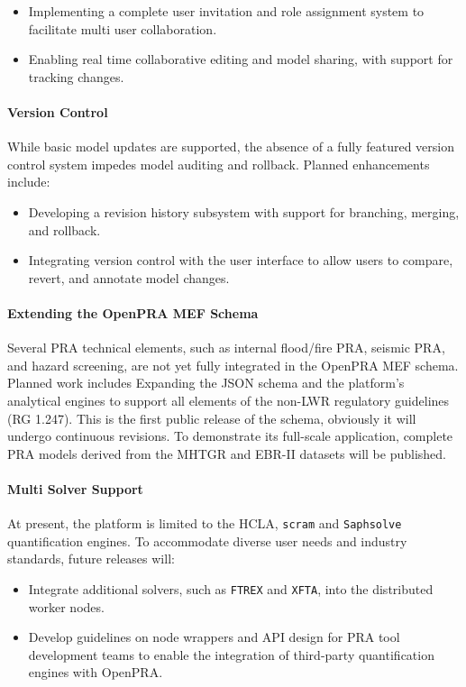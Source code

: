 \begin{itemize}
    \item Implementing a complete user invitation and role assignment system to facilitate multi user collaboration.
    \item Enabling real time collaborative editing and model sharing, with support for tracking changes.
\end{itemize}

\paragraph{Version Control}

While basic model updates are supported, the absence of a fully featured version control system impedes model auditing and rollback. Planned enhancements include:
\begin{itemize}
    \item Developing a revision history subsystem with support for branching, merging, and rollback.
    \item Integrating version control with the user interface to allow users to compare, revert, and annotate model changes.
\end{itemize}

\paragraph{Extending the OpenPRA MEF Schema}

Several PRA technical elements, such as internal flood/fire PRA, seismic PRA, and hazard screening, are not yet fully integrated in the OpenPRA MEF schema. Planned work includes Expanding the JSON schema and the platform's analytical engines to support all elements of the non-LWR regulatory guidelines (RG 1.247). This is the first public release of the schema, obviously it will undergo continuous revisions. To demonstrate its full-scale application, complete PRA models derived from the MHTGR and EBR-II datasets will be published.

\paragraph{Multi Solver Support}

At present, the platform is limited to the HCLA, \texttt{scram} and \texttt{Saphsolve} quantification engines. To accommodate diverse user needs and industry standards, future releases will:
\begin{itemize}
    \item Integrate additional solvers, such as \texttt{FTREX} and \texttt{XFTA}, into the distributed worker nodes.
    \item Develop guidelines on node wrappers and API design for PRA tool development teams to enable the integration of third-party quantification engines with OpenPRA.
\end{itemize}

